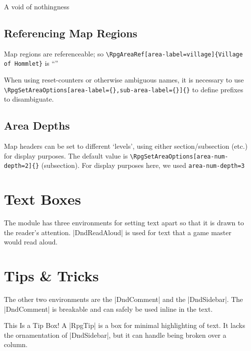 				A void of nothingness

			\subsection{Referencing Map Regions}

				Map regions are referenceable; so \verb|| is ``\RpgAreaRef[area-label=village]{Village of Hommlet}''

				When using reset-counters or otherwise ambiguous names, it is necessary to use \verb|\RpgSetAreaOptions[area-label={},sub-area-label={}]{}| to define prefixes to disambiguate.

			\subsection{Area Depths}

				Map headers can be set to different `levels', using either section/subsection (etc.) for display purposes. The default value is \verb|\RpgSetAreaOptions[area-num-depth=2]{}| (subsection). For display purposes here, we used \verb|area-num-depth=3|

	\section{Text Boxes}

	The module has three environments for setting text apart so that it is drawn to the reader's attention. |DndReadAloud| is used for text that a game master would read aloud.
	\section{Tips \& Tricks}
	The other two environments are the |DndComment| and the |DndSidebar|. The |DndComment| is breakable and can safely be used inline in the text.

	\begin{RpgTip}{This Is a Tip Box!}
	A |RpgTip| is a box for minimal highlighting of text. It lacks the ornamentation of |DndSidebar|, but it can handle being broken over a column.
	\end{RpgTip}

